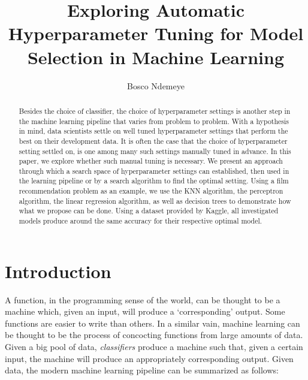 \documentclass{cup-ino}
\title{Exploring Automatic Hyperparameter Tuning for Model Selection in Machine Learning}
\author{Bosco Ndemeye}
\begin{document}
\maketitle

\begin{abstract}
Besides the choice of classifier, the choice of hyperparameter settings is another step in the machine learning pipeline that varies from problem to problem. With a hypothesis in mind, data scientists settle on well tuned hyperparameter settings that perform the best on their development data. It is often the case that the choice of hyperparameter setting settled on, is one among many such settings manually tuned in advance. In this paper, we explore whether such manual tuning  is necessary. We present an approach through which a search space of hyperparameter settings can established, then used in the learning pipeline or by a search algorithm to find the optimal setting. Using a film recommendation problem as an example, we use the KNN algorithm, the perceptron algorithm, the linear regression algorithm, as well as decision trees to demonstrate how what we propose can be done. Using a dataset provided by Kaggle, all investigated models produce around the same accuracy for their respective optimal model. 
\end{abstract}

\section{Introduction}

A function, in the programming sense of the world, can be thought to be a machine which, given an input, will produce a `corresponding' output. Some functions are easier to write than others. In a similar vain, machine learning can be thought to be the process of concocting functions from large amounts of data. Given a big pool of data, \textit{classifiers} produce a machine such that, given a certain input, the machine will produce an appropriately corresponding output. Given data, the modern machine learning pipeline can be summarized as follows:
\end{document}
